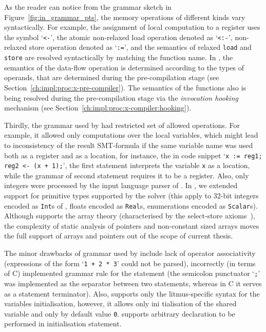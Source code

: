 As the reader can notice from the grammar sketch in Figure~\ref{fig:in_grammar_pts}, the memory operations of different kinds vary syntactically.
For example, the assignment of local computation to a register uses the symbol `\lstinline{<-}', the atomic non-relaxed load operation denoted as `\lstinline{<:-}', non-relaxed store operation denoted as `\lstinline{:=}', and the semantics of relaxed \lstinline{load} and \lstinline{store} are resolved syntactically by matching the function name.
In \porthos[2], the semantics of the data-flow operation is determined according to the types of operands, that are determined during the pre-compilation stage (see Section~\ref{ch:impl:proc:x-pre-compiler}).
The semantics of the functions also is being resolved during the pre-compilation stage via the \textit{invocation hooking} mechanism (see Section~\ref{ch:impl:proc:x-compiler:hooking}).

Thirdly, the grammar used by \porthos{} had restricted set of allowed operations. For example, it allowed only computations over the local variables, which might lead to inconsistency of the result SMT-formula if the same variable name was used both as a register and as a location, for instance, the in code snippet `\lstinline{x := reg1; reg2 <- (x + 1);}', the first statement interprets the variable \lstinline{x} as a location, while the grammar of second statement requires it to be a register. Also, only integers were processed by the input language parser of \porthos{}. In \porthos[2], we extended support for primitive types supported by the  solver (this apply to 32-bit integers encoded as \texttt{Int}s of , floats encoded as \texttt{Real}s, enumerations encoded as \texttt{Scalar}s).
Although  supports the array theory (characterised by the select-store axioms~\cite{de2011z3}), the complexity of static analysis of pointers and non-constant sized arrays moves the full support of arrays and pointers out of the scope of current thesis.

The minor drawbacks of grammar used by \porthos{} include lack of operator associativity (expressions of the form `\lstinline{1 + 2 * 3}' could not be parsed), incorrectly (in terms of C) implemented grammar rule for the statement (the semicolon punctuator `\lstinline{;}' was implemented as the separator between two statements, whereas in C it serves as a statement terminator). Also, \porthos{} supports only the litmus-specific syntax for the variables initialisation, however, it allows only ini
tialisation of the shared variable and only by default value \lstinline{0}. \porthos[2] supports arbitrary declaration to be performed in initialisation statement.


